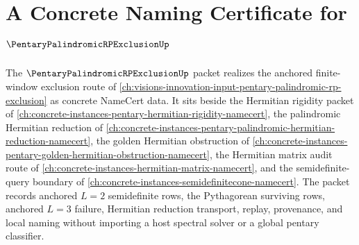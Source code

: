 \chapter{A Concrete Naming Certificate for $\PentaryPalindromicRPExclusionUp$}
\label{ch:concrete-instances-pentary-palindromic-rp-exclusion-namecert}

The $\PentaryPalindromicRPExclusionUp$ packet realizes the anchored finite-window exclusion route of \autoref{ch:visions-innovation-input-pentary-palindromic-rp-exclusion} as concrete NameCert data. It sits beside the Hermitian rigidity packet of \autoref{ch:concrete-instances-pentary-hermitian-rigidity-namecert}, the palindromic Hermitian reduction of \autoref{ch:concrete-instances-pentary-palindromic-hermitian-reduction-namecert}, the golden Hermitian obstruction of \autoref{ch:concrete-instances-pentary-golden-hermitian-obstruction-namecert}, the Hermitian matrix audit route of \autoref{ch:concrete-instances-hermitian-matrix-namecert}, and the semidefinite-query boundary of \autoref{ch:concrete-instances-semidefinitecone-namecert}. The packet records anchored $L=2$ semidefinite rows, the Pythagorean surviving rows, anchored $L=3$ failure, Hermitian reduction transport, replay, provenance, and local naming without importing a host spectral solver or a global pentary classifier.


